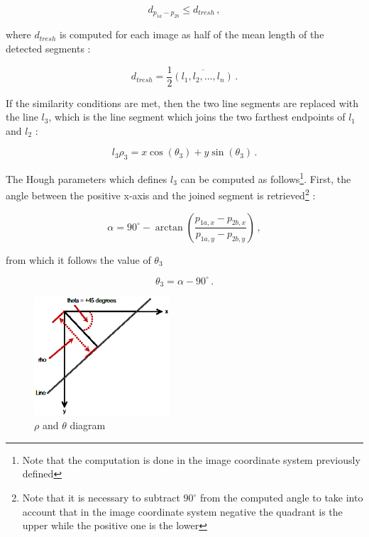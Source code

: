 \begin{equation}
d_{p_{1a}-p_{2b}} \leqslant d_{tresh} \,,
\end{equation}

where $d_{tresh}$ is computed for each image as half of the mean length of the detected segments :

\begin{equation}
d_{tresh} = {\frac{1}{2}} \overline{(l_1, l_2,\ldots, l_n)} \,.
\end{equation}

If the similarity conditions are met, then the two line segments are replaced with the line $l_3$, which is the line segment which joins the two farthest endpoints of $l_1$ and $l_2$ :

\begin{equation}
l_3 \rho_3 = x \cos (\theta_3) +  y \sin (\theta_3) \,.
\end{equation}

The Hough parameters which defines $l_3$ can be computed as follows\footnote{Note that the computation is done in the image coordinate system previously defined}. First, the angle between the positive x-axis and the joined segment is retrieved\footnote{Note that it is necessary to subtract $90^{\circ}$ from the computed angle to take into account that in the image coordinate system negative the quadrant is the upper while the positive one is the lower} :

\begin{equation}
\alpha = 90^{\circ} - \arctan{\left(\frac{p_{1a,x}-p_{2b,x}}{p_{1a,y}-p_{2b,y}}\right)} \,,
\end{equation}

from which it follows the value of $\theta_3$

\begin{equation}
\theta_3 = \alpha - 90^{\circ} \,.
\end{equation}

\begin{figure}[htbp]
  \centering
  \includegraphics[width=0.45\textwidth]{gfx/hough_rho_theta_diagram.eps}
  \caption{$\rho$ and $\theta$ diagram}
  \label{fig:theposeproblem}
\end{figure}

